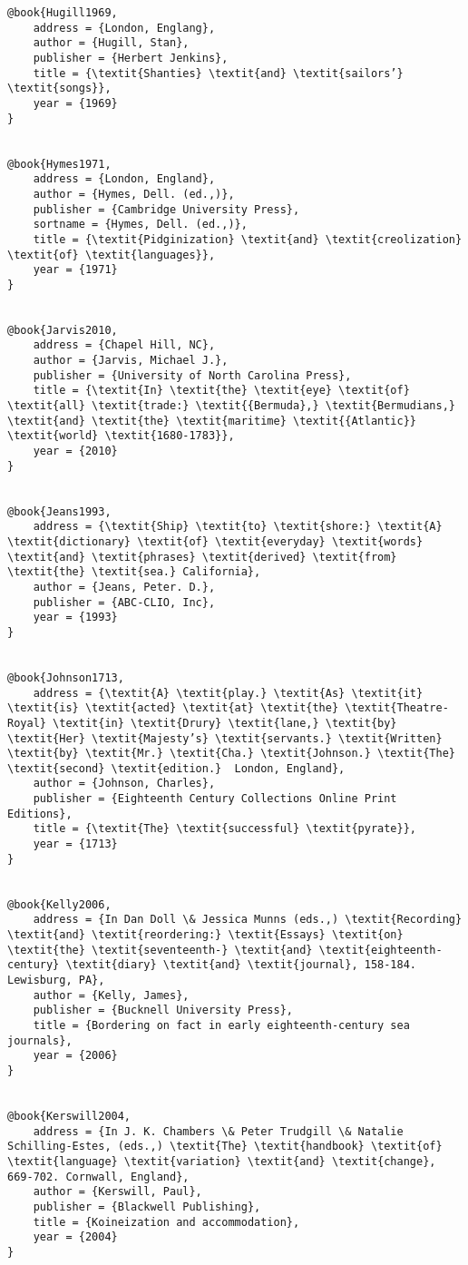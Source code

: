 \begin{verbatim}
@book{Hugill1969,
	address = {London, Englang},
	author = {Hugill, Stan},
	publisher = {Herbert Jenkins},
	title = {\textit{Shanties} \textit{and} \textit{sailors’} \textit{songs}},
	year = {1969}
}


@book{Hymes1971,
	address = {London, England},
	author = {Hymes, Dell. (ed.,)},
	publisher = {Cambridge University Press},
	sortname = {Hymes, Dell. (ed.,)},
	title = {\textit{Pidginization} \textit{and} \textit{creolization} \textit{of} \textit{languages}},
	year = {1971}
}


@book{Jarvis2010,
	address = {Chapel Hill, NC},
	author = {Jarvis, Michael J.},
	publisher = {University of North Carolina Press},
	title = {\textit{In} \textit{the} \textit{eye} \textit{of} \textit{all} \textit{trade:} \textit{{Bermuda},} \textit{Bermudians,} \textit{and} \textit{the} \textit{maritime} \textit{{Atlantic}} \textit{world} \textit{1680-1783}},
	year = {2010}
}


@book{Jeans1993,
	address = {\textit{Ship} \textit{to} \textit{shore:} \textit{A} \textit{dictionary} \textit{of} \textit{everyday} \textit{words} \textit{and} \textit{phrases} \textit{derived} \textit{from} \textit{the} \textit{sea.} California},
	author = {Jeans, Peter. D.},
	publisher = {ABC-CLIO, Inc},
	year = {1993}
}


@book{Johnson1713,
	address = {\textit{A} \textit{play.} \textit{As} \textit{it} \textit{is} \textit{acted} \textit{at} \textit{the} \textit{Theatre-Royal} \textit{in} \textit{Drury} \textit{lane,} \textit{by} \textit{Her} \textit{Majesty’s} \textit{servants.} \textit{Written} \textit{by} \textit{Mr.} \textit{Cha.} \textit{Johnson.} \textit{The} \textit{second} \textit{edition.}  London, England},
	author = {Johnson, Charles},
	publisher = {Eighteenth Century Collections Online Print Editions},
	title = {\textit{The} \textit{successful} \textit{pyrate}},
	year = {1713}
}


@book{Kelly2006,
	address = {In Dan Doll \& Jessica Munns (eds.,) \textit{Recording} \textit{and} \textit{reordering:} \textit{Essays} \textit{on} \textit{the} \textit{seventeenth-} \textit{and} \textit{eighteenth-century} \textit{diary} \textit{and} \textit{journal}, 158-184. Lewisburg, PA},
	author = {Kelly, James},
	publisher = {Bucknell University Press},
	title = {Bordering on fact in early eighteenth-century sea journals},
	year = {2006}
}


@book{Kerswill2004,
	address = {In J. K. Chambers \& Peter Trudgill \& Natalie Schilling-Estes, (eds.,) \textit{The} \textit{handbook} \textit{of} \textit{language} \textit{variation} \textit{and} \textit{change}, 669-702. Cornwall, England},
	author = {Kerswill, Paul},
	publisher = {Blackwell Publishing},
	title = {Koineization and accommodation},
	year = {2004}
}



\end{verbatim}
